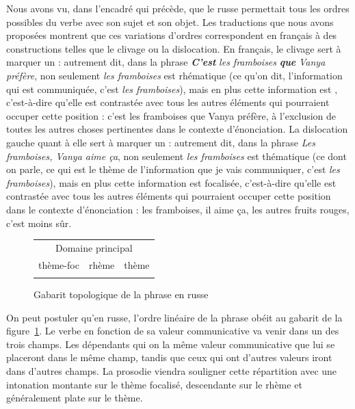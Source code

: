 {    Nous avons vu, dans l’encadré qui précède, que le russe permettait tous les ordres possibles du verbe avec son sujet et son objet. Les traductions que nous avons proposées montrent que ces variations d’ordres correspondent en français à des constructions telles que le clivage ou la dislocation. En français, le clivage sert à marquer un : autrement dit, dans la phrase \textbf{\textit{C’est}} \textit{les framboises} \textbf{\textit{que}} \textit{Vanya préfère}, non seulement \textit{les framboises} est rhématique (ce qu’on dit, l’information qui est communiquée, c’est \textit{les framboises}), mais en plus cette information est , c’est-à-dire qu’elle est contrastée avec tous les autres éléments qui pourraient occuper cette position : c’est les framboises que Vanya préfère, à l’exclusion de toutes les autres choses pertinentes dans le contexte d’énonciation. La dislocation gauche quant à elle sert à marquer un : autrement dit, dans la phrase \textit{Les framboises, Vanya aime ça}, non seulement \textit{les framboises} est thématique (ce dont on parle, ce qui est le thème de l’information que je vais communiquer, c’est \textit{les framboises}), mais en plus cette information est focalisée, c’est-à-dire qu’elle est contrastée avec tous les autres éléments qui pourraient occuper cette position dans le contexte d’énonciation : les framboises, il aime ça, les autres fruits rouges, c’est moins sûr.

    
    \begin{figure}[H]
    \caption{Gabarit topologique de la phrase en russe\label{fig:topo-russe}}
    \begin{tabular}{|c|c|c|}
     \hline
    \multicolumn{3}{|c|}{\cellcolor{lsDOIGray}Domaine principal}\\
    \hhline{---}
    thème-foc & rhème & thème\\
    \hhline{---}
    \end{tabular}
    \end{figure}

    On peut postuler qu’en russe, l’ordre linéaire de la phrase obéit au gabarit de la figure~\ref{fig:topo-russe}.
    Le verbe en fonction de sa valeur communicative va venir dans un des trois champs. Les dépendants qui on la même valeur communicative que lui se placeront dans le même champ, tandis que ceux qui ont d’autres valeurs iront dans d’autres champs. La prosodie viendra souligner cette répartition avec une intonation montante sur le thème focalisé, descendante sur le rhème et généralement plate sur le thème.

}
